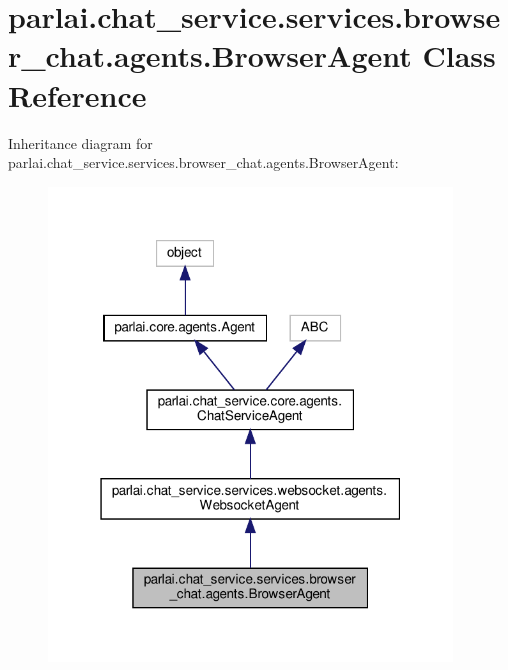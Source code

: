 \hypertarget{classparlai_1_1chat__service_1_1services_1_1browser__chat_1_1agents_1_1BrowserAgent}{}\section{parlai.\+chat\+\_\+service.\+services.\+browser\+\_\+chat.\+agents.\+Browser\+Agent Class Reference}
\label{classparlai_1_1chat__service_1_1services_1_1browser__chat_1_1agents_1_1BrowserAgent}


Inheritance diagram for parlai.\+chat\+\_\+service.\+services.\+browser\+\_\+chat.\+agents.\+Browser\+Agent\+:
\nopagebreak
\begin{figure}[H]
\begin{center}
\leavevmode
\includegraphics[width=304pt]{dd/d3f/classparlai_1_1chat__service_1_1services_1_1browser__chat_1_1agents_1_1BrowserAgent__inherit__graph}
\end{center}
\end{figure}


